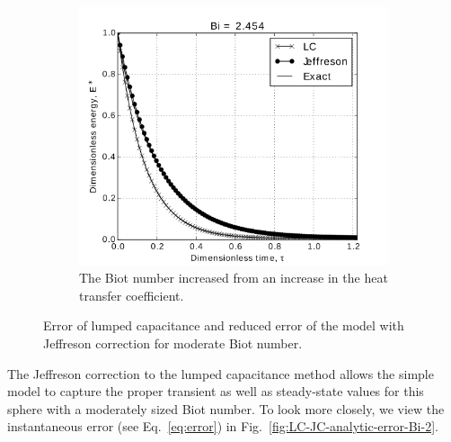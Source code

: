 \begin{figure}
        \begin{subfigure}[b]{0.65\textwidth}
                \includegraphics[width=\textwidth]{chapters/figures/LC-JC-analytic-sphere-in-fluid-Bi-2b}
                \caption{The Biot number increased from  an increase in the heat transfer coefficient.}
				\label{fig:LC-JC-analytic-sphere-in-fluid-Bi-2b}
        \end{subfigure}
        \caption[Error of lumped capacitance and Jeffreson correction for moderate Biot number]{Error of lumped capacitance and reduced error of the model with Jeffreson correction for moderate Biot number.}\label{fig:LC-JC-analytic-sphere-in-fluid-Bi-2}
\end{figure}

The Jeffreson correction to the lumped capacitance method allows the simple model to capture the proper transient as well as steady-state values for this sphere with a moderately sized Biot number. To look more closely, we view the instantaneous error (see Eq.~\ref{eq:error}) in Fig.~\ref{fig:LC-JC-analytic-error-Bi-2}.

